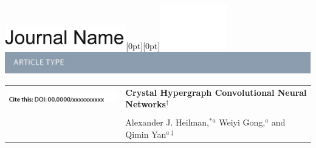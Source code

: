 \documentclass[twoside,twocolumn,9pt]{article}
\begin{document}
  \begin{@twocolumnfalse}
{\includegraphics[height=30pt]{head_foot/journal_name}\hfill\raisebox{0pt}[0pt][0pt]{\includegraphics[height=55pt]{head_foot/RSC_LOGO_CMYK}}\\[1ex]
\includegraphics[width=18.5cm]{head_foot/header_bar}}\par
\vspace{1em}
\sffamily
\begin{tabular}{m{4.5cm} p{13.5cm} }

\includegraphics{head_foot/DOI} & \noindent\LARGE{\textbf{Crystal Hypergraph Convolutional Neural Networks$^\dag$}} \\%
\vspace{0.3cm} & \vspace{0.3cm} \\

 & \noindent\large{Alexander J. Heilman,$^{\ast}$\textit{$^{a}$} Weiyi Gong,\textit{$^{a}$} and Qimin Yan\textit{$^{a\ddag}$}} \\%


\end{tabular}
\end{@twocolumnfalse}
\end{document}
